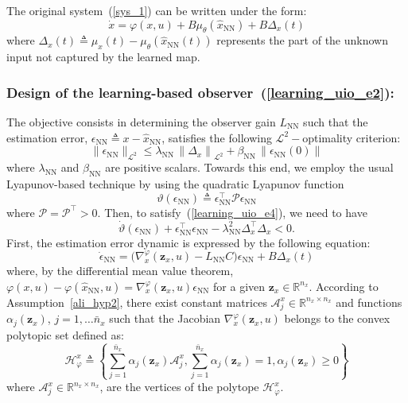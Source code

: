 \documentclass{ifacconf}
\def\eqref#1{(\ref{#1})}
\def\nn{\mathrm{NN}}
\def\Lo{L}
\begin{document}
The original system~\eqref{sys_1} can be written under the form:
\begin{equation}\label{learning_uio_e3}
        \dot{x} = \varphi(x,u) + B \mu_{\theta}(\hat{x}_{\nn}) + B \Delta_{x}(t)
\end{equation}
where $\Delta_{x}(t) \triangleq \mu_{x}(t) -  \mu_{\theta}(\hat{x}_{\nn}(t))$ represents the part of the unknown input not captured by the learned map.





\vspace*{-0.3cm}
\subsubsection{Design of the learning-based observer~\eqref{learning_uio_e2}:}
The objective consists in determining the observer gain $\Lo_{\nn}$ such that the estimation error, $\epsilon_{\nn} \triangleq x - \hat{x}_{\nn}$, satisfies the following $\mathcal{L}^{2}-$optimality criterion:
\begin{equation}\label{learning_uio_e4}
\| \epsilon_{\nn} \|_{\mathcal{L}^{2}} \leq \lambda_{\nn} \, \left\| \Delta_x \right\|_{\mathcal{L}^{2}}  + \beta_{\nn} \, \left\| \epsilon_{\nn}(0) \right\| 
\end{equation}
where $\lambda_{\nn}$ and $\beta_{\nn}$ are positive scalars. Towards this end, we employ the usual Lyapunov-based technique by using the quadratic Lyapunov function
$$
\vartheta\left( \epsilon_{\nn} \right) \triangleq \epsilon^{\top}_{\nn} \mathcal{P} \epsilon_{\nn}
$$
where $\mathcal{P} = \mathcal{P}^{\top} > 0$. Then, to satisfy~\eqref{learning_uio_e4}, we need to have
$$
\dot{\vartheta}\left( \epsilon_{\nn} \right) + \epsilon^{\top}_{\nn} \epsilon_{\nn} - \lambda^{2}_{\nn} \Delta^{\top}_x \Delta_x < 0.
$$
First, the estimation error dynamic is expressed by the following equation:
\begin{equation}\label{learning_uio_e5}
        \dot{\epsilon}_{\nn} = \Big( \nabla^{\varphi}_{x}(\bm{z}_{x},u) - \Lo_{\nn} C \Big) \epsilon_{\nn} + B \Delta_{x}(t)
\end{equation}
where, by the differential mean value theorem, $\varphi(x,u) - \varphi(\hat{x}_{\nn},u)=\nabla^{\varphi}_{x}(\bm{z}_{x},u)\epsilon_{\nn}$ for a given $\bm{z}_{x} \in \mathbb{R}^{n_x}$.
According to Assumption~\ref{ali_hyp2}, there exist constant matrices $\mathcal{A}^{x}_{j} \in \mathbb{R}^{n_x \times n_x}$ and functions $\alpha_{j}(\bm{z}_x)$, $j=1,\dots \bar{n}_{x}$ such that the Jacobian $\nabla^{\varphi}_{x}(\bm{z}_{x},u)$ belongs to the convex polytopic set defined as:
\begin{equation}\label{varphi_x}
\mathcal{H}^{x}_{\varphi} \triangleq \left\{ \sum^{\bar{n}_{x}}_{j=1}\alpha_{j} (\bm{z}_{x}) \mathcal{A}^{x}_{j}, \sum^{\bar{n}_{x}}_{j=1}\alpha_{j}(\bm{z}_{x}) =1, \alpha_{j}(\bm{z}_{x}) \geq0 \right\}
\end{equation}
where $\mathcal{A}^{x}_{j} \in \mathbb{R}^{n_x \times n_x}$, are the vertices of the polytope $\mathcal{H}^{x}_{\varphi}$. 
\end{document}
